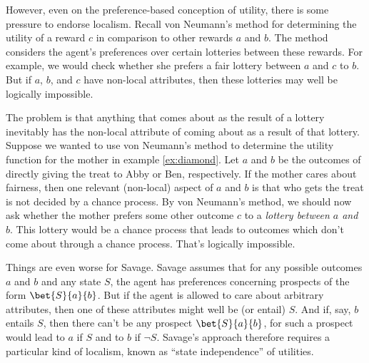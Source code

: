 

However, even on the preference-based conception of utility, there is
some pressure to endorse localism. Recall von Neumann's method for
determining the utility of a reward $c$ in comparison to other rewards
$a$ and $b$. The method considers the agent's preferences over certain
lotteries between these rewards. For example, we would check whether
she prefers a fair lottery between $a$ and $c$ to $b$. But if $a$,
$b$, and $c$ have non-local attributes, then these lotteries may well
be logically impossible.

The problem is that anything that comes about as the result of a
lottery inevitably has the non-local attribute of coming about as a
result of that lottery. Suppose we wanted to use von Neumann's method
to determine the utility function for the mother in example
\ref{ex:diamond}. Let $a$ and $b$ be the outcomes of directly giving
the treat to Abby or Ben, respectively. If the mother cares about
fairness, then one relevant (non-local) aspect of $a$ and $b$ is that
who gets the treat is not decided by a chance process. By von
Neumann's method, we should now ask whether the mother prefers some
other outcome $c$ to a \emph{lottery between $a$ and $b$}. This
lottery would be a chance process that leads to outcomes which don't
come about through a chance process. That's logically impossible.

Things are even worse for Savage. Savage assumes that for any possible
outcomes $a$ and $b$ and any state $S$, the agent has preferences
concerning prospects of the form $\bet{S}{a}{b}$. But if the agent is
allowed to care about arbitrary attributes, then one of these
attributes might well be (or entail) $S$. And if, say, $b$ entails
$S$, then there can't be any prospect $\bet{S}{a}{b}$, for such a
prospect would lead to $a$ if $S$ and to $b$ if $\neg S$. Savage's
approach therefore requires a particular kind of localism, known as
``state independence'' of utilities.


